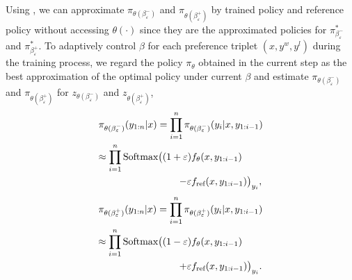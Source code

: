 Using , we can approximate $\pi_{\theta(\beta^-_\varepsilon)}$ and $\pi_{\theta(\beta^+_\varepsilon)}$ by trained policy and reference policy without accessing $\theta(\cdot)$ since they are the approximated policies for $\pi^*_{\beta^-_\varepsilon}$ and $\pi^*_{\beta^+_\varepsilon}$. To adaptively control $\beta$ for each preference triplet $(x, y^w, y^l)$ during the training process, we regard the policy $\pi_\theta$ obtained in the current step as the best approximation of the optimal policy under current $\beta$ and estimate $\pi_{\theta(\beta^-_\varepsilon)}$ and $\pi_{\theta(\beta^+_\varepsilon)}$ for $z_{\theta(\beta^-_\varepsilon)}$ and $z_{\theta(\beta^+_\varepsilon)}$,
\begin{equation}\label{eqn:p_epsilon_estimate}
\begin{split}
& \pi_{\theta(\beta^-_\varepsilon)} (y_{1:n}|x) = \prod_{i=1}^n \pi_{\theta(\beta^-_\varepsilon)} (y_i|x, y_{1:i-1}) \\
&\begin{split}
    \approx \prod_{i=1}^n \textnormal{Softmax} \big(
    (1 + \varepsilon) &f_{\theta} (x, y_{1:i-1}) \\
    - \varepsilon &f_{\text{ref}} (x, y_{1:i-1}) \big)_{y_i}, \\
\end{split}
\end{split}
\end{equation}
\begin{equation}\label{eqn:n_epsilon_estimate}
\begin{split}
& \pi_{\theta(\beta^+_\varepsilon)} (y_{1:n}|x) = \prod_{i=1}^n \pi_{\theta(\beta^+_\varepsilon)} (y_i|x, y_{1:i-1}) \\
&\begin{split}
    \approx \prod_{i=1}^n \textnormal{Softmax} \big(
    (1 - \varepsilon) &f_{\theta} (x, y_{1:i-1}) \\
    + \varepsilon &f_{\text{ref}} (x, y_{1:i-1}) \big)_{y_i}.
\end{split}
\end{split}
\end{equation}

